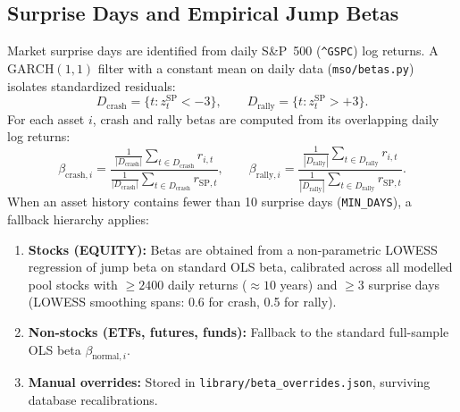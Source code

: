 \documentclass[11pt]{article}
\begin{document}
\subsection{Surprise Days and Empirical Jump Betas}
Market surprise days are identified from daily S\&P~500 (\nolinkurl{^GSPC}) log returns.
A $\mathrm{GARCH}(1,1)$ filter with a constant mean on daily data (\nolinkurl{mso/betas.py}) isolates standardized residuals:
\begin{equation}
D_{\mathrm{crash}} = \{t : z_t^{\mathrm{SP}} < -3\}, \qquad
D_{\mathrm{rally}} = \{t : z_t^{\mathrm{SP}} > +3\}.
\end{equation}
For each asset $i$, crash and rally betas are computed from its overlapping daily log returns:
\begin{equation}
\beta_{\mathrm{crash}, i} = \frac{\frac{1}{|D_{\mathrm{crash}}|}\sum_{t \in D_{\mathrm{crash}}} r_{i, t}}{\frac{1}{|D_{\mathrm{crash}}|}\sum_{t \in D_{\mathrm{crash}}} r_{\mathrm{SP}, t}}, \qquad
\beta_{\mathrm{rally}, i} = \frac{\frac{1}{|D_{\mathrm{rally}}|}\sum_{t \in D_{\mathrm{rally}}} r_{i, t}}{\frac{1}{|D_{\mathrm{rally}}|}\sum_{t \in D_{\mathrm{rally}}} r_{\mathrm{SP}, t}}.
\end{equation}
When an asset history contains fewer than 10 surprise days (\texttt{MIN\_DAYS}), a fallback hierarchy applies:
\begin{enumerate}[nosep]
\item \textbf{Stocks (EQUITY):} Betas are obtained from a non-parametric LOWESS regression of jump beta on standard OLS
beta, calibrated across all modelled pool stocks with $\ge 2400$ daily returns ($\approx 10$ years) and $\ge 3$
surprise days (LOWESS smoothing spans: 0.6 for crash, 0.5 for rally).
\item \textbf{Non-stocks (ETFs, futures, funds):} Fallback to the standard full-sample OLS beta $\beta_{\mathrm{normal}, i}$.
\item \textbf{Manual overrides:} Stored in \texttt{library/beta\_overrides.json}, surviving database recalibrations.
\end{enumerate}
\end{document}
